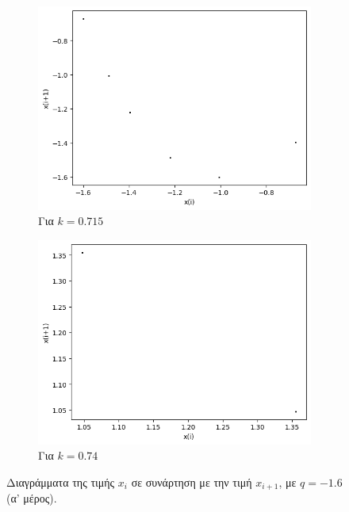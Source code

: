 \begin{figure}[ht]
\begin{subfigure}[b]{0.4\textwidth}
		\includegraphics[width=\textwidth]{LateX images/graphs q16/g15}
		\caption{Για $k=0.715$}
		\label{f:k86}
	\end{subfigure}
	\hfill
	\begin{subfigure}[b]{0.4\textwidth}
		\centering
		\includegraphics[width=\textwidth]{LateX images/graphs q16/g16}
		\caption{Για $k=0.74$}
		\label{f:k87}
	\end{subfigure}
	\hfill
	
	\caption{Διαγράμματα της τιμής \(x_i\) σε συνάρτηση με την τιμή \(x_{i+1}\), με $q=-1.6$ (α' μέρος).}
	\label{f:k240}
\end{figure}

